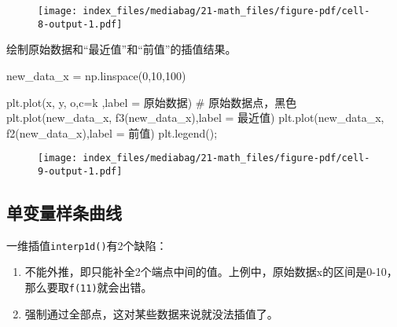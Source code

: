 \documentclass[
  letterpaper,
  DIV=11,
  numbers=noendperiod]{scrreprt}
\newenvironment{Shaded}{\begin{snugshade}}{\end{snugshade}}
\newcommand{\CommentTok}[1]{\textcolor[rgb]{0.37,0.37,0.37}{#1}}
\newcommand{\DecValTok}[1]{\textcolor[rgb]{0.68,0.00,0.00}{#1}}
\newcommand{\NormalTok}[1]{\textcolor[rgb]{0.00,0.23,0.31}{#1}}
\newcommand{\OperatorTok}[1]{\textcolor[rgb]{0.37,0.37,0.37}{#1}}
\newcommand{\StringTok}[1]{\textcolor[rgb]{0.13,0.47,0.30}{#1}}
\providecommand{\tightlist}{%
  \setlength{\itemsep}{0pt}\setlength{\parskip}{0pt}}\usepackage{longtable,booktabs,array}
\begin{document}
\begin{figure}[H]

{\centering \texttt{[image: index\_files/mediabag/21-math\_files/figure-pdf/cell-8-output-1.pdf]}

}

\end{figure}

绘制原始数据和``最近值''和``前值''的插值结果。

\begin{Shaded}
\begin{Highlighting}[]
\NormalTok{new\_data\_x }\OperatorTok{=}\NormalTok{ np.linspace(}\DecValTok{0}\NormalTok{,}\DecValTok{10}\NormalTok{,}\DecValTok{100}\NormalTok{)}

\NormalTok{plt.plot(x, y, }\StringTok{\textquotesingle{}o\textquotesingle{}}\NormalTok{,c}\OperatorTok{=}\StringTok{\textquotesingle{}k\textquotesingle{}}\NormalTok{ ,label }\OperatorTok{=} \StringTok{\textquotesingle{}原始数据\textquotesingle{}}\NormalTok{) }\CommentTok{\# 原始数据点，黑色}
\NormalTok{plt.plot(new\_data\_x, f3(new\_data\_x),label }\OperatorTok{=} \StringTok{\textquotesingle{}最近值\textquotesingle{}}\NormalTok{)}
\NormalTok{plt.plot(new\_data\_x, f2(new\_data\_x),label }\OperatorTok{=} \StringTok{\textquotesingle{}前值\textquotesingle{}}\NormalTok{)}
\NormalTok{plt.legend()}\OperatorTok{;}
\end{Highlighting}
\end{Shaded}

\begin{figure}[H]

{\centering \texttt{[image: index\_files/mediabag/21-math\_files/figure-pdf/cell-9-output-1.pdf]}

}

\end{figure}

\hypertarget{ux5355ux53d8ux91cfux6837ux6761ux66f2ux7ebf}{%
\subsection{单变量样条曲线}\label{ux5355ux53d8ux91cfux6837ux6761ux66f2ux7ebf}}

一维插值\texttt{interp1d()}有2个缺陷：

\begin{enumerate}
\def\labelenumi{\arabic{enumi}.}
\tightlist
\item
  不能外推，即只能补全2个端点中间的值。上例中，原始数据x的区间是0-10，那么要取\texttt{f(11)}就会出错。
\item
  强制通过全部点，这对某些数据来说就没法插值了。
\end{enumerate}
\end{document}
